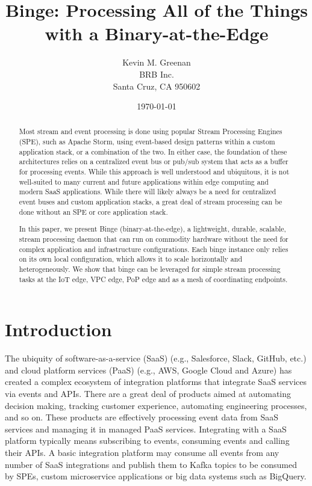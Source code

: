 \documentclass[10pt,twocolumn]{article}
\title{Binge: Processing All of the Things with a Binary-at-the-Edge}
\author{
        Kevin M. Greenan\\
        BRB Inc.\\
        Santa Cruz, CA 950602
}
\date{\today}
\begin{document}
\maketitle

\begin{abstract}
Most stream and event processing is done using popular Stream Processing
Engines (SPE), such as Apache Storm, using event-based design patterns within a
custom application stack, or a combination of the two.  In either case, the
foundation of these architectures relies on a centralized event bus or pub/sub
system that acts as a buffer for processing events.  While this approach is
well understood and ubiquitous, it is not well-suited to many current and
future applications within edge computing and modern SaaS applications.  While
there will likely always be a need for centralized event buses and custom
application stacks, a great deal of stream processing can be done without an
SPE or core application stack.

In this paper, we present Binge (binary-at-the-edge), a lightweight, durable,
scalable, stream processing daemon that can run on commodity hardware without
the need for complex application and infrastructure configurations.  Each binge
instance only relies on its own local configuration, which allows it to scale
horizontally and heterogeneously.  We show that binge can be leveraged for
simple stream processing tasks at the IoT edge, VPC edge, PoP edge and as a
mesh of coordinating endpoints.
\end{abstract}


\section{Introduction}
The ubiquity of software-as-a-service (SaaS) (e.g., Salesforce, Slack, GitHub,
etc.) and cloud platform services (PaaS) (e.g., AWS, Google Cloud and Azure)
has created a complex ecosystem of integration platforms that integrate SaaS
services via events and APIs.  There are a great deal of products aimed at
automating decision making, tracking customer experience, automating
engineering processes, and so on.   These products are effectively processing
event data from SaaS services and managing it in managed PaaS services.
Integrating with a SaaS platform typically means subscribing to events,
consuming events and calling their APIs.  A basic integration platform may
consume all events from any number of SaaS integrations and publish them to
Kafka topics to be consumed by SPEs, custom microservice applications or big
data systems such as BigQuery.  
\end{document}
